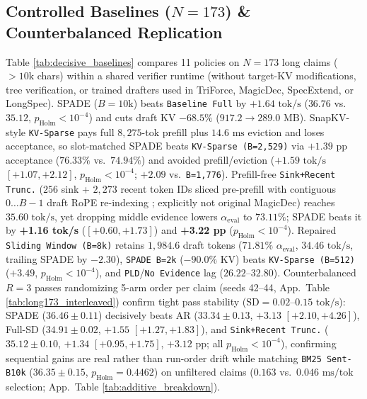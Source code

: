 \documentclass[11pt]{article}
\begin{document}
\subsection{Controlled Baselines (\texorpdfstring{$N=173$}{N=173}) \& Counterbalanced Replication}
\label{sec:latency_decomp}
Table \ref{tab:decisive_baselines} compares 11 policies on $N=173$ long claims ($>10\text{k}$ chars) within a shared verifier runtime (without target-KV modifications, tree verification, or trained drafters used in TriForce, MagicDec, SpecExtend, or LongSpec). SPADE ($B=10\text{k}$) beats \texttt{Baseline Full} by $+1.64\text{ tok/s}$ ($36.76$ vs.\ $35.12$, $p_{\text{Holm}} < 10^{-4}$) and cuts draft KV $-68.5\%$ ($917.2 \to 289.0\text{ MB}$). SnapKV-style \texttt{KV-Sparse} pays full $8,275$-tok prefill plus $14.6\text{ ms}$ eviction and loses acceptance, so slot-matched SPADE beats \texttt{KV-Sparse (B=2,529)} via $+1.39\text{ pp}$ acceptance ($76.33\%$ vs.\ $74.94\%$) and avoided prefill/eviction ($+1.59\text{ tok/s}$ $[+1.07, +2.12]$, $p_{\text{Holm}}<10^{-4}$; $+2.09$ vs.\ \texttt{B=1,776}). Prefill-free \texttt{Sink+Recent Trunc.} ($256$ sink + $2,273$ recent token IDs sliced pre-prefill with contiguous $0\dots B-1$ draft RoPE re-indexing \citep{xiao2024streamingllm}; explicitly not original MagicDec) reaches $35.60\text{ tok/s}$, yet dropping middle evidence lowers $\alpha_{\text{eval}}$ to $73.11\%$; SPADE beats it by \textbf{+1.16 tok/s} ($[+0.60, +1.73]$) and \textbf{+3.22 pp} ($p_{\text{Holm}} < 10^{-4}$). Repaired \texttt{Sliding Window (B=8k)} retains $1,984.6$ draft tokens ($71.81\%$ $\alpha_{\text{eval}}$, $34.46\text{ tok/s}$, trailing SPADE by $-2.30$), \texttt{SPADE B=2k} ($-90.0\%$ KV) beats \texttt{KV-Sparse (B=512)} ($+3.49$, $p_{\text{Holm}}<10^{-4}$), and \texttt{PLD}/\texttt{No Evidence} lag ($26.22$--$32.80$). Counterbalanced $R=3$ passes randomizing 5-arm order per claim (seeds 42--44, App.\ Table \ref{tab:long173_interleaved}) confirm tight pass stability ($\text{SD}=0.02$--$0.15\text{ tok/s}$): SPADE ($36.46 \pm 0.11$) decisively beats AR ($33.34 \pm 0.13$, $+3.13$ $[+2.10, +4.26]$), Full-SD ($34.91 \pm 0.02$, $+1.55$ $[+1.27, +1.83]$), and \texttt{Sink+Recent Trunc.} ($35.12 \pm 0.10$, $+1.34$ $[+0.95, +1.75]$, $+3.12\text{ pp}$; all $p_{\text{Holm}}<10^{-4}$), confirming sequential gains are real rather than run-order drift while matching \texttt{BM25 Sent-B10k} ($36.35 \pm 0.15$, $p_{\text{Holm}}=0.4462$) on unfiltered claims ($0.163$ vs.\ $0.046\text{ ms/tok}$ selection; App.\ Table \ref{tab:additive_breakdown}).
\end{document}
